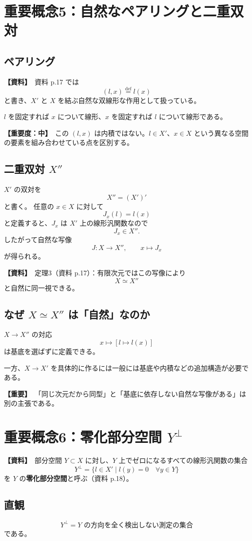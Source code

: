 \documentclass[a4paper,11pt]{ltjsarticle}
\newcommand{\sourceitem}{\textbf{【資料】}}
\newcommand{\midimportance}{\textbf{【重要度：中】}}
\newcommand{\highimportance}{\textbf{【重要】}}
\begin{document}
\section{重要概念5：自然なペアリングと二重双対}

\subsection{ペアリング}
\sourceitem\ 資料 p.17 では
\[
(l,x)\overset{\mathrm{def}}{=}l(x)
\]
と書き、$X'$ と $X$ を結ぶ自然な双線形な作用として扱っている。

$l$ を固定すれば $x$ について線形、$x$ を固定すれば $l$ について線形である。

\midimportance\ この $(l,x)$ は内積ではない。$l\in X'$、$x\in X$ という異なる空間の要素を組み合わせている点を区別する。

\subsection{二重双対 $X''$}
$X'$ の双対を
\[
X''=(X')'
\]
と書く。
任意の $x\in X$ に対して
\[
J_x(l)=l(x)
\]
と定義すると、$J_x$ は $X'$ 上の線形汎関数なので
\[
J_x\in X''.
\]
したがって自然な写像
\[
J:X\to X'',\qquad x\mapsto J_x
\]
が得られる。

\sourceitem\ 定理3（資料 p.17）：有限次元ではこの写像により
\[
\boxed{X\simeq X''}
\]
と自然に同一視できる。

\subsection{なぜ $X\simeq X''$ は「自然」なのか}
$X\to X''$ の対応
\[
x\mapsto[l\mapsto l(x)]
\]
は基底を選ばずに定義できる。

一方、$X\to X'$ を具体的に作るには一般には基底や内積などの追加構造が必要である。

\highimportance\ 「同じ次元だから同型」と「基底に依存しない自然な写像がある」は別の主張である。

\section{重要概念6：零化部分空間 $Y^\perp$}

\sourceitem\ 部分空間 $Y\subset X$ に対し、$Y$ 上でゼロになるすべての線形汎関数の集合
\[
\boxed{
Y^\perp
=
\{l\in X'\mid l(y)=0\quad\forall y\in Y\}
}
\]
を $Y$ の\textbf{零化部分空間}と呼ぶ（資料 p.18）。

\subsection{直観}
\[
\boxed{Y^\perp=\text{$Y$ の方向を全く検出しない測定の集合}}
\]
である。
\end{document}
